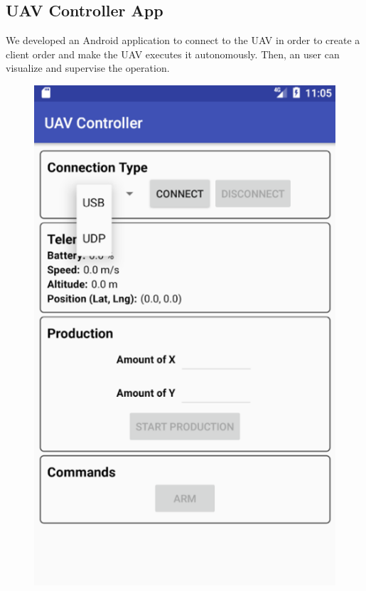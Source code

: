 \documentclass[12pt]{article}
\begin{document}
\subsection{UAV Controller App}
\label{subsec:app}

We developed an Android application to connect to the UAV in order to create a client order and make the UAV executes it autonomously. Then, an user can visualize and supervise the operation.

\begin{figure}[]
\centering
\begin{minipage}{.55\textwidth}
  \centering
  \includegraphics[width=.7\linewidth]{appMain}
  \label{fig:appMain}
\end{minipage}%
\begin{minipage}{.55\textwidth}
  \centering

\end{minipage}
\end{figure}
\end{document}

